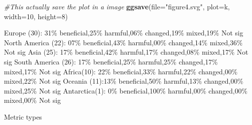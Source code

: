 \documentclass[
]{article}
\newenvironment{Shaded}{\begin{snugshade}}{\end{snugshade}}
\newcommand{\CommentTok}[1]{\textcolor[rgb]{0.56,0.35,0.01}{\textit{#1}}}
\newcommand{\DataTypeTok}[1]{\textcolor[rgb]{0.13,0.29,0.53}{#1}}
\newcommand{\DecValTok}[1]{\textcolor[rgb]{0.00,0.00,0.81}{#1}}
\newcommand{\KeywordTok}[1]{\textcolor[rgb]{0.13,0.29,0.53}{\textbf{#1}}}
\newcommand{\NormalTok}[1]{#1}
\newcommand{\StringTok}[1]{\textcolor[rgb]{0.31,0.60,0.02}{#1}}
\begin{document}
\begin{Shaded}
\begin{Highlighting}[]
\CommentTok{#This actually save the plot in a image}
    \KeywordTok{ggsave}\NormalTok{(}\DataTypeTok{file=}\StringTok{"figure4.svg"}\NormalTok{, }\DataTypeTok{plot=}\NormalTok{k, }\DataTypeTok{width=}\DecValTok{10}\NormalTok{, }\DataTypeTok{height=}\DecValTok{8}\NormalTok{)}
\end{Highlighting}
\end{Shaded}

Europe (30): 31\% beneficial,25\% harmful,06\% changed,19\% mixed,19\%
Not sig North America (22): 07\% beneficial,43\% harmful,00\%
changed,14\% mixed,36\% Not sig Asia (25): 17\% beneficial,42\%
harmful,17\% changed,08\% mixed,17\% Not sig South America (26): 17\%
beneficial,25\% harmful,25\% changed,17\% mixed,17\% Not sig Africa(10):
22\% beneficial,33\% harmful,22\% changed,00\% mixed,22\% Not sig
Oceania (11):13\% beneficial,50\% harmful,13\% changed,00\% mixed,25\%
Not sig Antarctica(1): 0\% beneficial,100\% harmful,00\% changed,00\%
mixed,00\% Not sig

Metric types
\end{document}
